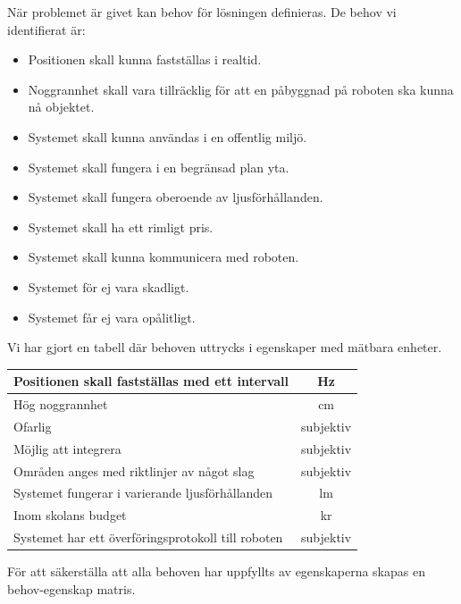 \documentclass[11pt, a4paper]{report}
\begin{document}
När problemet är givet kan behov för lösningen definieras. De behov vi identifierat är:

\begin{itemize}
	\item Positionen skall kunna fastställas i realtid.
	\item Noggrannhet skall vara tillräcklig för att en påbyggnad på roboten ska kunna nå objektet.
	\item Systemet skall kunna användas i en offentlig miljö.
	\item Systemet skall fungera i en begränsad plan yta.
	\item Systemet skall fungera oberoende av ljusförhållanden.
	\item Systemet skall ha ett rimligt pris.
	\item Systemet skall kunna kommunicera med roboten.
	\item Systemet för ej vara skadligt.
	\item Systemet får ej vara opålitligt.
\end{itemize}

Vi har gjort en tabell där behoven uttrycks i egenskaper med mätbara enheter.\\

\begin{center}
     \begin{tabular}{l | c}
  		Positionen skall fastställas med ett intervall & Hz \\ \hline
        Hög noggrannhet & cm\\ \hline
        Ofarlig & subjektiv\\ \hline
        Möjlig att integrera & subjektiv\\ \hline
        Områden anges med riktlinjer av något slag & subjektiv \\ \hline
        Systemet fungerar i varierande ljusförhållanden & lm \\ \hline
        Inom skolans budget & kr \\ \hline
        Systemet har ett överföringsprotokoll till roboten & subjektiv
  \end{tabular}
\end{center}
\cleardoublepage
För att säkerställa att alla behoven har uppfyllts av egenskaperna skapas en behov-egenskap matris.
\end{document}
